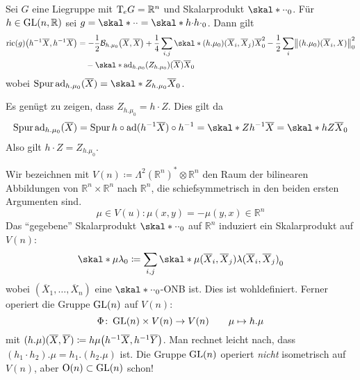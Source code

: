 \begin{satz}[{name=[Verbesserung der Formel für die Ricci-Krümmung]}]
	Sei $G$ eine Liegruppe mit $\mathrm{T}\mkern-0.85mu_e G = \mathbb{R}^n$ und Skalarprodukt $\skal*{\cdot }{\cdot }_0$.
	Für $h \in \operatorname{GL}(n,\mathbb{R})$ sei $g = \skal*{\cdot }{\cdot } = \skal*{h \cdot }{h \cdot }_0$.
	Dann gilt
	\begin{align}
		\ric(g) \enbrace*{h^{-1} \overline{X}, h^{-1} \overline{X}} &= -\frac{1}{2} \mathcal{B}_{h.\mu_0} \enbrace*{\overline{X},\overline{X}} + \frac{1}{4} \sum_{i,j} \skal*{(h.\mu_0)(\overline{X}_i, \overline{X}_j)}{\overline{X}}_0^2 - \frac{1}{2} \sum_i \norm*{(h.\mu_0)(\overline{X}_i, X)}_0^2 \\
		&\hspace{1em} - \skal*{\ad_{h.\mu_0}(Z_{h.\mu_0})(\overline{X})}{\overline{X}} _0
	\end{align}
	wobei $\Spur \ad_{h.\mu_0}(\overline{X}) = \skal*{Z_{h.\mu_0}}{\overline{X}}_0$.
\end{satz}
\begin{beweis}
	Es genügt zu zeigen, dass $Z_{h.\mu_0} = h \cdot Z$.
	Dies gilt da
	\begin{align}
		\Spur \ad_{h.\mu_0} (\overline{X}) = \Spur h \circ \ad(h^{-1} \overline{X}) \circ h^{-1} = \skal*{Z}{h^{-1} \overline{X}} = \skal*{h Z}{\overline{X}}_0 
	\end{align}
	Also gilt $h \cdot Z = Z_{h.\mu_0}$.
\end{beweis}

Wir bezeichnen mit $V(n) \coloneqq  \Lambda^2(\mathbb{R}^n)^* \otimes \mathbb{R}^n$ den Raum der bilinearen Abbildungen von $\mathbb{R}^n \times \mathbb{R}^n$ nach $\mathbb{R}^n$, die schiefsymmetrisch in den beiden ersten Argumenten sind.
\[
	\mu \in V(u) : \mu(x,y) = - \mu(y,x) \in \mathbb{R}^n
\]
Das \enquote{gegebene} Skalarprodukt $\skal*{\cdot }{\cdot }_0$ auf $\mathbb{R}^n$ induziert ein Skalarprodukt auf $V(n)$:
\[
	\skal*{\mu}{\lambda}_0 \coloneqq \sum_{i,j} \skal*{\mu(\overline{X}_i, \overline{X}_j)}{\lambda(\overline{X}_i, \overline{X}_j)}_0
\]
wobei $(\overline{X}_1, \ldots ,\overline{X}_n)$ eine $\skal*{\cdot }{\cdot }_0$-ONB ist. Dies ist wohldefiniert.
Ferner operiert die Gruppe $\operatorname{GL}(n)$ auf $V(n)$:
\[
	\Phi \colon \operatorname{GL}(n) \times V(n) \to V(n) \qquad \mu \mapsto h.\mu
\]
mit $(h.\mu)(\overline{X},\overline{Y}) \coloneqq h \mu \enbrace*{h^{-1} \overline{X}, h^{-1} \overline{Y}}$.
Man rechnet leicht nach, dass $(h_1 \cdot h_2).\mu = h_1.(h_2.\mu)$ ist.
Die Gruppe $\operatorname{GL}(n)$ operiert \emph{nicht} isometrisch auf $V(n)$, aber $\operatorname{O}(n) \subset \operatorname{GL}(n)$ schon!


